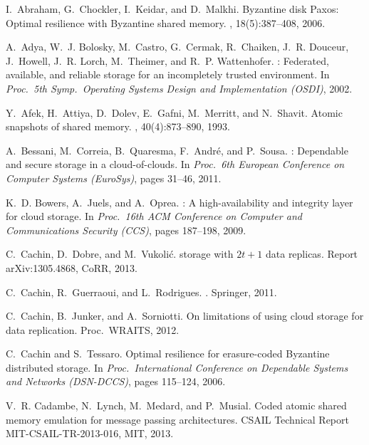 \documentclass[oribibl]{llncs}
\theoremstyle{definition-boldhead}
\begin{document}
\begin{thebibliography}{10}

I.~Abraham, G.~Chockler, I.~Keidar, and D.~Malkhi.
\newblock Byzantine disk {Paxos}: Optimal resilience with {Byzantine} shared
  memory.
, 18(5):387--408, 2006.

A.~Adya, W.~J. Bolosky, M.~Castro, G.~Cermak, R.~Chaiken, J.~R. Douceur,
  J.~Howell, J.~R. Lorch, M.~Theimer, and R.~P. Wattenhofer.
: Federated, available, and reliable storage for an
  incompletely trusted environment.
\newblock In {\em Proc.\ 5th Symp.\ Operating Systems Design and Implementation
  (OSDI)}, 2002.

Y.~Afek, H.~Attiya, D.~Dolev, E.~Gafni, M.~Merritt, and N.~Shavit.
\newblock Atomic snapshots of shared memory.
, 40(4):873--890, 1993.

A.~Bessani, M.~Correia, B.~Quaresma, F.~Andr\'{e}, and P.~Sousa.
: Dependable and secure storage in a cloud-of-clouds.
\newblock In {\em Proc.\ 6th European Conference on Computer Systems
  (EuroSys)}, pages 31--46, 2011.

K.~D. Bowers, A.~Juels, and A.~Oprea.
: A high-availability and integrity layer for cloud storage.
\newblock In {\em Proc.\ 16th ACM Conference on Computer and Communications
  Security (CCS)}, pages 187--198, 2009.

C.~Cachin, D.~Dobre, and M.~Vukoli{\'c}.
 storage with $2t+1$ data replicas.
\newblock Report arXiv:1305.4868, CoRR, 2013.

C.~Cachin, R.~Guerraoui, and L.~Rodrigues.
.
\newblock Springer, 2011.

C.~Cachin, B.~Junker, and A.~Sorniotti.
\newblock On limitations of using cloud storage for data replication.
\newblock Proc.\ WRAITS, 2012.

C.~Cachin and S.~Tessaro.
\newblock Optimal resilience for erasure-coded {Byzantine} distributed storage.
\newblock In {\em Proc.\ International Conference on Dependable Systems and
  Networks (DSN-DCCS)}, pages 115--124, 2006.

V.~R. Cadambe, N.~Lynch, M.~Medard, and P.~Musial.
\newblock Coded atomic shared memory emulation for message passing
  architectures.
\newblock CSAIL Technical Report MIT-CSAIL-TR-2013-016, MIT, 2013.


\end{thebibliography}
\end{document}
